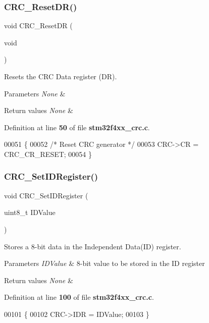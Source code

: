 \subsubsection{C\+R\+C\+\_\+\+Reset\+D\+R()}
{\footnotesize\ttfamily void C\+R\+C\+\_\+\+Reset\+DR (\begin{DoxyParamCaption}\item[{void}]{ }\end{DoxyParamCaption})}



Resets the C\+RC Data register (DR). 


\begin{DoxyParams}{Parameters}
{\em None} & \\
\hline
\end{DoxyParams}

\begin{DoxyRetVals}{Return values}
{\em None} & \\
\hline
\end{DoxyRetVals}


Definition at line \textbf{ 50} of file \textbf{ stm32f4xx\+\_\+crc.\+c}.


\begin{DoxyCode}
00051 \{
00052   \textcolor{comment}{/* Reset CRC generator */}
00053   CRC->CR = CRC_CR_RESET;
00054 \}
\end{DoxyCode}
\mbox{\label{group__CRC__Private__Functions_ga769c9a42be57b972ae61bbada0f2e46a}} 
\subsubsection{C\+R\+C\+\_\+\+Set\+I\+D\+Register()}
{\footnotesize\ttfamily void C\+R\+C\+\_\+\+Set\+I\+D\+Register (\begin{DoxyParamCaption}\item[{uint8\+\_\+t}]{I\+D\+Value }\end{DoxyParamCaption})}



Stores a 8-\/bit data in the Independent Data(\+I\+D) register. 


\begin{DoxyParams}{Parameters}
{\em I\+D\+Value} & 8-\/bit value to be stored in the ID register \\
\hline
\end{DoxyParams}

\begin{DoxyRetVals}{Return values}
{\em None} & \\
\hline
\end{DoxyRetVals}


Definition at line \textbf{ 100} of file \textbf{ stm32f4xx\+\_\+crc.\+c}.


\begin{DoxyCode}
00101 \{
00102   CRC->IDR = IDValue;
00103 \}
\end{DoxyCode}
